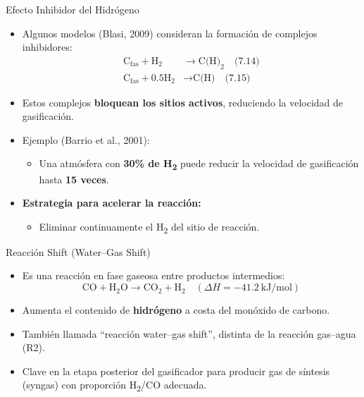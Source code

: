 \documentclass[../../main.tex]{subfiles}
\begin{document}
\begin{frame}{Efecto Inhibidor del Hidrógeno}
\small
\begin{itemize}
  \item Algunos modelos (Blasi, 2009) consideran la formación de complejos inhibidores:
  \begin{align*}
  \text{C}_{\text{fas}} + \text{H}_2 &\rightarrow \text{C(H)}_2 \quad \text{(7.14)} \\
  \text{C}_{\text{fas}} + 0.5\text{H}_2 &\rightarrow \text{C(H)} \quad \text{(7.15)}
  \end{align*}

  \item Estos complejos \textbf{bloquean los sitios activos}, reduciendo la velocidad de gasificación.

  \item Ejemplo (Barrio et al., 2001):
  \begin{itemize}
    \item Una atmósfera con \textbf{30\% de H\textsubscript{2}} puede reducir la velocidad de gasificación hasta \textbf{15 veces}.
  \end{itemize}

  \item \textbf{Estrategia para acelerar la reacción:}
  \begin{itemize}
    \item Eliminar continuamente el H\textsubscript{2} del sitio de reacción.
  \end{itemize}
\end{itemize}
\end{frame}

\begin{frame}{Reacción Shift (Water–Gas Shift)}
\small
\begin{itemize}
  \item Es una reacción en fase gaseosa entre productos intermedios:
  \[
  \text{CO} + \text{H}_2\text{O} \rightarrow \text{CO}_2 + \text{H}_2 \quad (\Delta H = -41.2\ \text{kJ/mol})
  \]
  \item Aumenta el contenido de \textbf{hidrógeno} a costa del monóxido de carbono.
  \item También llamada “reacción water–gas shift”, distinta de la reacción gas–agua (R2).
  \item Clave en la etapa posterior del gasificador para producir gas de síntesis (syngas) con proporción H\textsubscript{2}/CO adecuada.
\end{itemize}
\end{frame}
\end{document}
